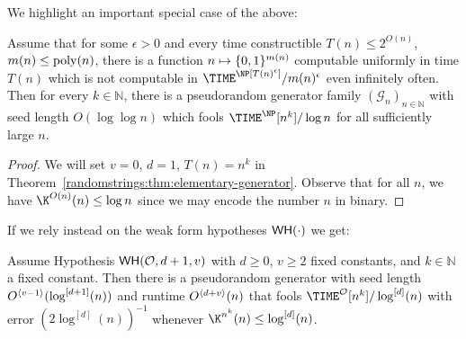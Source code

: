 We highlight an important special case of the above:
\begin{theorem}\label{randomstrings:thm:double-exp-generator}
Assume that for some $\epsilon> 0$ and every time constructible $T(n) \leq 2^{O(n)}$, $m(n) \leq \mathrm{poly}(n)$, there is a function $n \mapsto \{0,1\}^{m(n)}$ computable uniformly in time $T(n)$ which is not computable in $\TIME^\NP[T(n)^\epsilon]/m(n)^{\epsilon}$ even infinitely often. Then for every $k \in \mathbb{N}$, there is a pseudorandom generator family $(\mathcal{G}_n)_{n \in \mathbb{N}}$ with seed length $O(\log \log n)$ which fools $\TIME^{\NP}[n^k]/\log n$ for all sufficiently large $n$.
\end{theorem}
\begin{proof}
We will set $v=0$, $d = 1$, $T(n) = n^k$ in Theorem~\ref{randomstrings:thm:elementary-generator}. Observe that for all $n$, we have $\K^{O(n)}(n) \leq \log n$ since we may encode the number $n$ in binary.
\end{proof}

If we rely instead on the weak form hypotheses $\mathsf{WH}(\cdot)$ we get:

\begin{theorem}\label{randomstrings:thm:weak-generator}
Assume Hypothesis $\mathsf{WH}(\mathcal{O},d+1,v)$ with $d \geq 0$, $v \geq 2$ fixed constants, and $k \in \mathbb{N}$ a fixed constant. Then there is a pseudorandom generator with seed length $O^{\langle v -1  \rangle}(\log^{[d+1]}(n))$ and runtime $O^{\langle d+v \rangle}(n)$ that fools $\TIME^\mathcal{O}[n^k]/\log^{[d]}(n)$ with error $(2 \log^{[d]}(n))^{-1}$ whenever $\K^{n^k}(n) \leq \log^{[d]}(n)$. 
\end{theorem}

